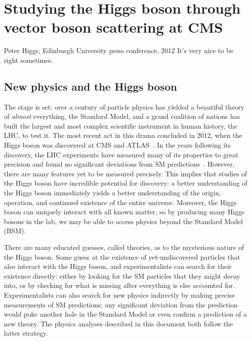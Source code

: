 \chapter{Studying the Higgs boson through vector boson scattering at CMS}\label{ch:higgs_vbs}
\begin{aquote}{Peter Higgs, Edinburgh University press conference, 2012}
    It's very nice to be right sometimes.
\end{aquote}

\section{New physics and the Higgs boson}
The stage is set: over a century of particle physics has yielded a beautiful theory of \textit{almost} everything, the Standard Model, and a grand coalition of nations has built the largest and most complex scientific instrument in human history, the LHC, to test it. 
The most recent act in this drama concluded in 2012, when the Higgs boson was discovered at CMS and ATLAS~\cite{CMSdisc, ATLASdisc}. 
In the years following its discovery, the LHC experiments have measured many of its properties to great precision and found no significant deviations from SM predictions~\cite{NatureHiggsCMS2022, NatureHiggsATLAS2022}. 
However, there are many features yet to be measured precisely. 
This implies that studies of the Higgs boson have incredible potential for discovery: a better understanding of the Higgs boson immediately yields a better understanding of the origin, operation, and continued existence of the entire universe. 
Moreover, the Higgs boson can uniquely interact with all known matter, so by producing many Higgs bosons in the lab, we may be able to access physics beyond the Standard Model (BSM). %

There are many educated guesses, called theories, as to the mysterious nature of the Higgs boson. 
Some guess at the existence of yet-undiscovered particles that also interact with the Higgs boson\footnotemark{}, and experimentalists can search for their existence directly: either by looking for the SM particles that they might decay into, or by checking for what is missing after everything is else accounted for. 
Experimentalists can also search for new physics indirectly by making precise measurements of SM predictions; any significant deviation from the prediction would poke another hole in the Standard Model or even confirm a prediction of a new theory. 
The physics analyses described in this document both follow the latter strategy.

